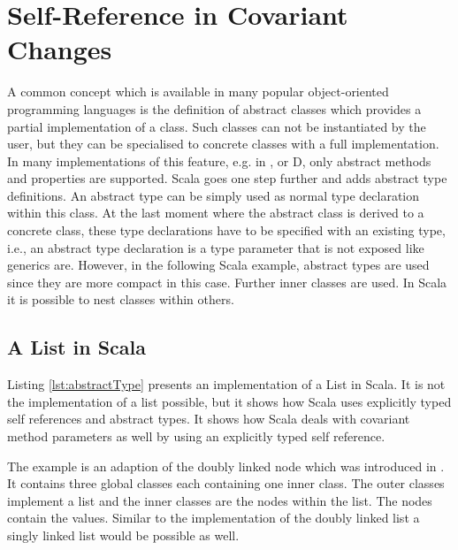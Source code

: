 \section{Self-Reference in Covariant Changes}
A common concept which is available in many popular object-oriented
programming languages is the definition of abstract classes which provides
a partial implementation of a class. Such classes can not be instantiated
by the user, but they can be specialised to concrete classes with a full
implementation. In many implementations of this feature, e.g. in \cpp,
\cs or D, only abstract methods and properties are supported. Scala
goes one step further and adds abstract type definitions. An abstract
type can be simply used as normal type declaration within this class. At
the last moment where the abstract class is derived to a concrete class,
these type declarations have to be specified with an existing type, i.e.,
an abstract type declaration is a type parameter that is not exposed
like generics are. However, in the following Scala example, abstract
types are used since they are more compact in this case. Further inner
classes are used. In Scala it is possible to nest classes within others.

\subsection{A List in Scala}
Listing \ref{lst:abstractType} presents an implementation of a List
in Scala. It is not the implementation of a list possible, but it shows
how Scala uses explicitly typed self references and abstract types. It
shows how Scala deals with covariant method parameters as well by using
an explicitly typed self reference.

The example is an adaption of the doubly linked node which was introduced
in . It contains three global classes each
containing one inner class. The outer classes implement a list and
the inner classes are the nodes within the list. The nodes contain the values. 
Similar to the implementation of the doubly linked list 
a singly linked list would be possible as well.

